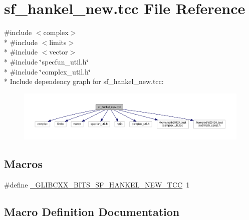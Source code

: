 \hypertarget{sf__hankel__new_8tcc}{}\section{sf\+\_\+hankel\+\_\+new.\+tcc File Reference}
\label{sf__hankel__new_8tcc}
{\ttfamily \#include $<$complex$>$}\\*
{\ttfamily \#include $<$limits$>$}\\*
{\ttfamily \#include $<$vector$>$}\\*
{\ttfamily \#include \char`\"{}specfun\+\_\+util.\+h\char`\"{}}\\*
{\ttfamily \#include \char`\"{}complex\+\_\+util.\+h\char`\"{}}\\*
Include dependency graph for sf\+\_\+hankel\+\_\+new.\+tcc\+:
\nopagebreak
\begin{figure}[H]
\begin{center}
\leavevmode
\includegraphics[width=350pt]{sf__hankel__new_8tcc__incl}
\end{center}
\end{figure}
\subsection*{Macros}
\begin{DoxyCompactItemize}
\item 
\#define \hyperlink{sf__hankel__new_8tcc_a3f0d94d8fb94ad2e003fd0b54ce51a6d}{\+\_\+\+G\+L\+I\+B\+C\+X\+X\+\_\+\+B\+I\+T\+S\+\_\+\+S\+F\+\_\+\+H\+A\+N\+K\+E\+L\+\_\+\+N\+E\+W\+\_\+\+T\+C\+C}~1
\end{DoxyCompactItemize}


\subsection{Macro Definition Documentation}
\hypertarget{sf__hankel__new_8tcc_a3f0d94d8fb94ad2e003fd0b54ce51a6d}{}
